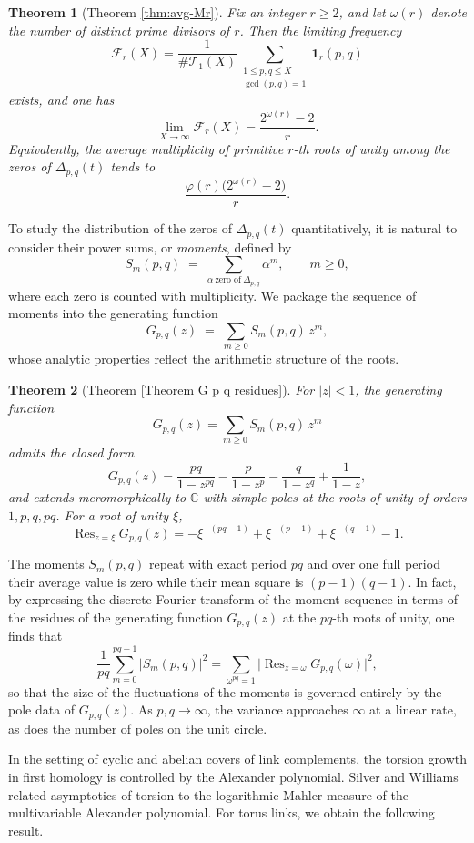 \documentclass[table]{amsart}
\newtheorem{lthm}{Theorem}
\numberwithin{equation}{section}
\begin{document}
\begin{lthm}[Theorem \ref{thm:avg-Mr}]
Fix an integer $r\ge2$, and let $\omega(r)$ denote the number of distinct prime divisors of $r$. Then the limiting frequency
\[
\mathcal{F}_r(X)=\frac{1}{\#\mathcal{T}_1(X)}\sum_{\substack{1\le p,q\le X\\ \gcd(p,q)=1}} \mathbf{1}_r(p,q)
\]
exists, and one has
\[
\lim_{X\to\infty}\mathcal{F}_r(X)=\frac{2^{\omega(r)}-2}{r}.
\]
Equivalently, the average multiplicity of primitive $r$-th roots of unity among the zeros of $\Delta_{p,q}(t)$ tends to
\[
\frac{\varphi(r)\bigl(2^{\omega(r)}-2\bigr)}{r}.
\]
\end{lthm}
To study the distribution of the zeros of $\Delta_{p,q}(t)$ quantitatively, it is natural to consider their power sums, or \emph{moments}, defined by
\[
S_m(p,q) \;=\; \sum_{\alpha\ \text{zero of}\ \Delta_{p,q}} \alpha^m,
\qquad m\ge0,
\]
where each zero is counted with multiplicity. We package the sequence of moments into the generating function
\[
G_{p,q}(z)\;=\;\sum_{m\ge0} S_m(p,q)\,z^m,
\]
whose analytic properties reflect the arithmetic structure of the roots.  

\begin{lthm}[Theorem \ref{Theorem G p q residues}]
For $|z|<1$, the generating function
\[
G_{p,q}(z)=\sum_{m\ge0} S_m(p,q)\,z^m
\]
admits the closed form
\[
G_{p,q}(z)=\frac{pq}{1-z^{pq}}-\frac{p}{1-z^p}-\frac{q}{1-z^q}+\frac{1}{1-z},
\]
and extends meromorphically to $\mathbb{C}$ with simple poles at the roots of unity of orders $1,p,q,pq$. For a root of unity $\xi$,
\[
\operatorname{Res}_{z=\xi}G_{p,q}(z)
= -\xi^{-(pq-1)}+\xi^{-(p-1)}+\xi^{-(q-1)}-1.
\]
\end{lthm}

The moments $S_m(p,q)$ repeat with exact period $pq$ and over one full period their average value is zero while their mean square is $(p-1)(q-1)$. In fact, by expressing the discrete Fourier transform of the moment sequence in terms of the residues of the generating function $G_{p,q}(z)$ at the $pq$-th roots of unity, one finds that
\[
\frac{1}{pq}\sum_{m=0}^{pq-1}\lvert S_m(p,q)\rvert^2
=
\sum_{\omega^{pq}=1}\lvert \operatorname{Res}_{z=\omega}G_{p,q}(\omega)\rvert^2,
\]
\noindent so that the size of the fluctuations of the moments is governed entirely by the pole data of $G_{p,q}(z)$. As $p, q\rightarrow \infty$, the variance approaches $\infty$ at a linear rate, as does the number of poles on the unit circle.

\par In the setting of cyclic and abelian covers of link complements, the torsion growth in first homology is controlled by the Alexander polynomial. Silver and Williams \cite{SW1, SW2} related asymptotics of torsion to the logarithmic Mahler measure of the multivariable Alexander polynomial. For torus links, we obtain the following result.
\end{document}
